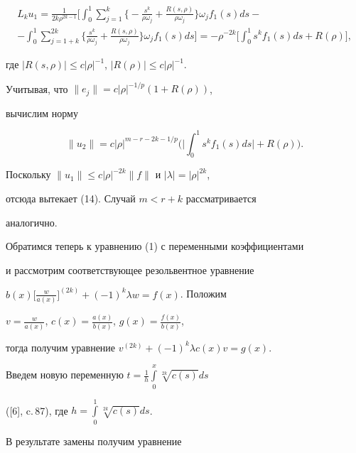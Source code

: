 \begin{multline*} 


L_k u_1=\frac{1}{2k\rho^{2k-1}}\bigg[\int^1_0 


\sum^k_{j=1}\bigg\{-\frac{s^k}{\rho\omega_j}+ 


\frac{R(s,\rho)}{\rho\omega_j}\bigg\}\omega_j f_1(s)ds - \\ 


-\int^1_0\sum^{2k}_{j=1+k}\bigg\{\frac{s^k}{\rho\omega_j}+ 


\frac{R(s,\rho)}{\rho\omega_j}\bigg\}\omega_j f_1(s)ds\bigg]= 


-\rho^{-2k}\bigg[\int^1_0 s^k f_1(s)ds+R(\rho)\bigg], 


\end{multline*} 


где $|R(s,\rho)|\le c|\rho|^{-1}$, $|R(\rho)|\le c|\rho|^{-1}$. 


 


Учитывая, что $\|e_j\|=c|\rho|^{-1/p}(1+R(\rho))$, 


вычислим норму 


$$ 


\|u_2\|=c|\rho|^{m-r-2k-1/p}\bigg(\bigg|\int^1_0 


s^k f_1(s)ds\bigg|+R(\rho)\bigg). 


$$ 


Поскольку $\|u_1\|\le c|\rho|^{-2k}\|f\|$ и $|\lambda|=|\rho|^{2k}$, 


отсюда вытекает (14). Случай $m<r+k$ рассматривается 


аналогично. 


 


Обратимся теперь к уравнению (1) с переменными коэффициентами  


и рассмотрим соответствующее резольвентное уравнение 


$b(x)\big[\frac{w}{a(x)}\big]^{(2k)}+(-1)^k\lambda w=f(x)$. Положим 


$v=\frac{w}{a(x)}$, $c(x)=\frac{a(x)}{b(x)}$, $g(x)=\frac{f(x)}{b(x)}$, 


тогда получим уравнение $v^{(2k)}+(-1)^k\lambda c(x)v=g(x)$. 


Введем новую переменную $t=\frac{1}{h}\int\limits^x_0\sqrt[2k]{c(s)}ds$ 


([6], c.\,87), где $h=\int\limits^1_0\sqrt[2k]{c(s)}ds$. 


В результате замены получим уравнение 


